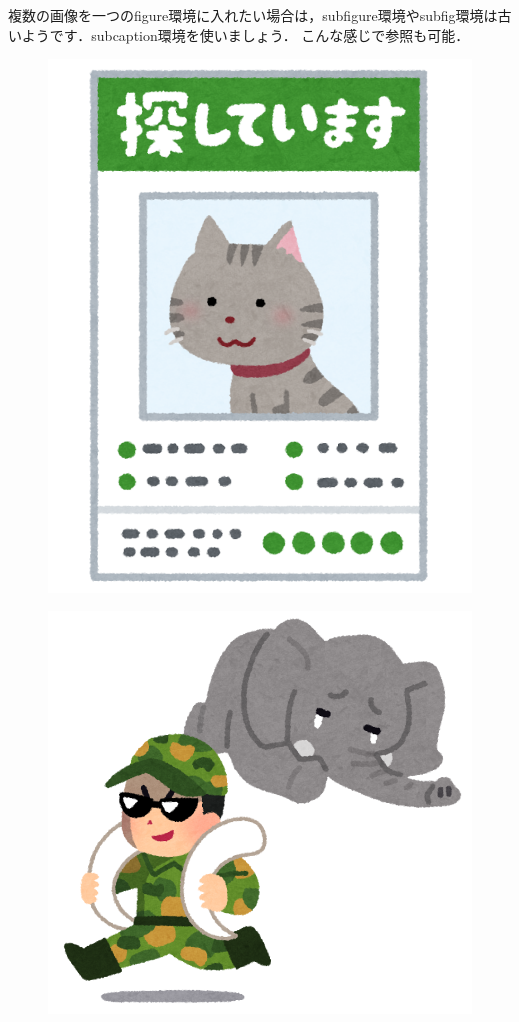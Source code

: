\documentclass[platex,dvipdfmx]{jlreq}%
\numberwithin{equation}{section}%
\begin{document}
複数の画像を一つのfigure環境に入れたい場合は，subfigure環境やsubfig環境は古いようです．subcaption環境を使いましょう．
こんな感じで参照も可能．

\begin{figure}[tb]
  \begin{minipage}[b]{.5\columnwidth}
   \centering
   \includegraphics[width=\columnwidth]{./figure/cat.png}
   \label{fig:frog}
 \end{minipage}%
 \begin{minipage}[b]{.5\columnwidth}
  \centering
  \includegraphics[width=\columnwidth]{./figure/elephant.png}

\end{minipage}
\end{figure}
\end{document}
